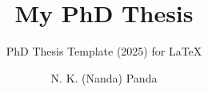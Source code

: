\documentclass{layout/TU-Delft-report}
\begin{document}
\frontmatter


\title{\textbf{My PhD Thesis}}

\subtitle{PhD Thesis Template (2025) for \LaTeX} 

\author{N. K. (Nanda) Panda}
\subject{Delft University of Technology }
\makecover





\tableofcontents



\mainmatter





\appendix



\end{document}
